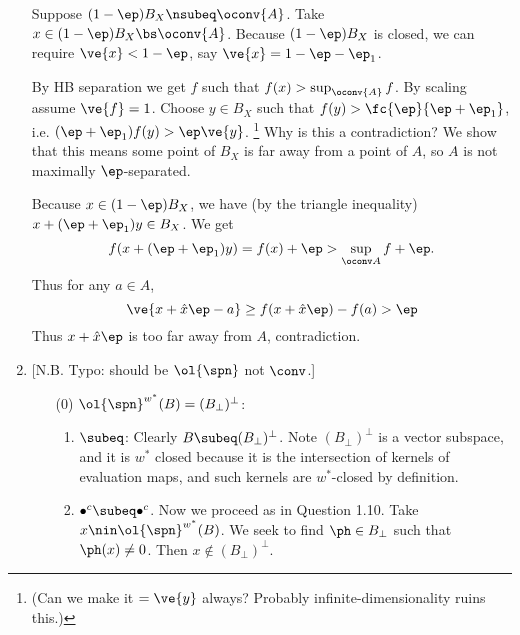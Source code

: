 \begin{enumerate}

Suppose $(1-\ep)B_X\nsubeq \oconv{A}$. Take $x\in (1-\ep)B_X\bs \oconv{A}$. Because $(1-\ep)B_X$ is closed, we can require $\ve{x}<1-\ep$, say $\ve{x}=1-\ep-\ep_1$.

By HB separation we get $f$ such that $f(x)>\sup_{\oconv{A}} f$. By scaling assume $\ve{f}=1$. 
Choose $y\in B_X$ such that  $f(y)>\fc{\ep}{\ep+\ep_1}$, i.e. $(\ep+\ep_1)f(y)>\ep\ve{y}$.
 \footnote{(Can we make it $=\ve{y}$ always? Probably infinite-dimensionality ruins this.)} %
Why is this a contradiction? We show that this means some point of $B_X$ is far away from a point of $A$, so $A$ is not maximally $\ep$-separated.

Because $x\in (1-\ep)B_X$, we have (by the triangle inequality) $x+(\ep+\ep_1)y\in B_X$. We get
\[
f(x+(\ep+\ep_1) y)=f(x)+\ep>\sup_{\oconv A}f+\ep.
\]
Thus for any $a\in A$,
\[
\ve{x+\hat x\ep -a}\ge f(x+\hat x\ep)-f(a)>\ep
\]
Thus $x+\hat x \ep$ is too far away from $A$, contradiction. 

\item  
{} [N.B. Typo: should be $\ol{\spn}$ not $\conv$.]
\begin{enumerate}
\item[(0)]
$\ol{\spn}^{w^*}(B)=(B_{\perp})^{\perp}$: 
\begin{enumerate}
\item
$\subeq$: Clearly $B\subeq (B_{\perp})^{\perp}$. Note $(B_{\perp})^{\perp}$ is a vector subspace, and it is $w^*$ closed because it is the intersection of kernels of evaluation maps, and such kernels are $w^*$-closed by definition.
\item $\bullet^c\subeq \bullet^c$.
Now we proceed as in Question 1.10. Take $x\nin \ol{\spn}^{w^*}(B)$. %
We seek to find $\ph\in B_{\perp}$ such that $\ph(x)\ne 0$. Then $x\nin (B_{\perp})^{\perp}$.


\end{enumerate}
\end{enumerate}
\end{enumerate}
